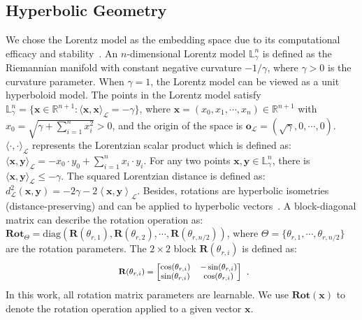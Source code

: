 \subsection{Hyperbolic Geometry}
We chose the Lorentz model as the embedding space due to its computational efficacy and stability~\cite{nickel2018_hype_geo}.
An $n$-dimensional Lorentz model $\mathbb{L}^{n}_{\gamma}$ is defined as the Riemannian manifold 
with constant negative curvature $-1/\gamma$, where $\gamma>0$ is the curvature parameter.
When $\gamma = 1$, the Lorentz model can be viewed as a unit hyperboloid model.
The points in the Lorentz model satisfy $\mathbb{L}^n_{\gamma} = \{\mathbf{x} \in \mathbb{R}^{n+1}: \langle  \mathbf{x}, \mathbf{x} \rangle_{\mathcal{L}} = -\gamma \}$, 
where $\mathbf{x} = (x_0, x_1, \cdots, x_n ) \in \mathbb{R}^{n+1}$ with $x_0 = \sqrt{\gamma+ \sum^{n}_{i=1}x_i^2} > 0$, and the origin of the space is $\mathbf{o}_{\mathcal{L}} = (\sqrt{\gamma}, 0, \cdots, 0)$. 
$\langle  \cdot, \cdot \rangle_{\mathcal{L}}$ represents the Lorentzian scalar product which is defined as:
$\langle  \mathbf{x}, \mathbf{y} \rangle_{\mathcal{L}} = -x_0 \cdot y_0 + \sum^{n}_{i=1}x_i \cdot y_i$.
For any two points $\mathbf{x}, \mathbf{y} \in \mathbb{L}^n_{\gamma}$, there is $\langle  \mathbf{x}, \mathbf{y} \rangle_{\mathcal{L}} \le -\gamma$. The squared Lorentzian distance is defined as:
$ d^2_{\mathcal{L}}(\mathbf{x}, \mathbf{y}) =-2 \gamma-2\left\langle\mathbf{x}, \mathbf{y} \right\rangle_{\mathcal{L}}$.
Besides, rotations are hyperbolic isometries (distance-preserving) and can be applied to hyperbolic vectors~\cite{ACL20_chami2020low, feng2022role}. A block-diagonal matrix can describe the rotation operation as: $\mathbf{Rot}_{\Theta}= \text{diag} \left(\mathbf{R}\left(\theta_{r, 1}\right), \mathbf{R}\left(\theta_{r, 2}\right), \cdots, \mathbf{R}\left(\theta_{r, n / 2}\right) \right)$, where $\Theta = \{ \theta_{r,1}, \cdots, \theta_{r, n/2} \}$ are the rotation parameters. The $2 \times 2$ block $\mathbf{R}(\theta_{r, i})$ is defined as:
\begin{equation}
\footnotesize
\begin{array}{cc} \mathbf{R}(\theta_{r,i}) = \begin{bmatrix}
    \cos(\theta_{r,i}) & -\sin(\theta_{r,i}) \\
    \sin(\theta_{r,i}) & \cos(\theta_{r,i}) \end{bmatrix}
\end{array}.
\end{equation}
In this work, all rotation matrix parameters are learnable.
We use $\mathbf{Rot}(\mathbf{x})$ to denote the rotation operation applied to a given vector $\mathbf{x}$.


